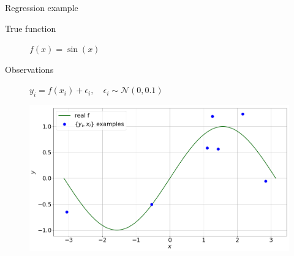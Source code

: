 \documentclass[lualatex, aspectratio=169]{beamer}
\begin{document}
\begin{frame}{Regression example}

  \begin{description}
    \item[True function] $f(x) = \sin(x)$
    \item[Observations] $y_i = f(x_i) + \epsilon_i, \quad \epsilon_i \sim \mathcal{N}(0, 0.1)$
  \end{description}

  \begin{figure}
    \includegraphics[width=0.6\pagewidth]{assets/regress.png}
  \end{figure}

\end{frame}






\end{document}

